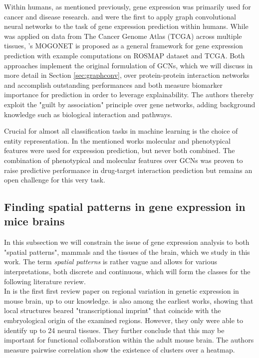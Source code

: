 \documentclass[]{article}
\renewcommand{\cite}{\citep}
\begin{document}
Within humans, as mentioned previously, gene expression was primarily used for cancer and disease research. \citet{schulte2021integration} and \citet{wang2021mogonet} were the first to apply graph convolutional neural networks to the task of gene expression prediction within humans. While \citet{schulte2021integration} was applied on data from The Cancer Genome Atlas (TCGA)\cite{tomczak2015review} across multiple tissues, \citet{wang2021mogonet}'s MOGONET is proposed as a general framework for gene expression prediction with example computations on ROSMAP dataset and TCGA. Both approaches implement the original formulation of GCNs\cite{GCNConv}, which we will discuss in more detail in Section \ref{sec:graphconv}, over protein-protein interaction networks and accomplish outstanding performances and both measure biomarker importance for prediction in order to leverage explainability. The authors thereby exploit the "guilt by association" principle \cite{Oliver2000, Gillis2012} over gene networks, adding background knowledge such as biological interaction and pathways.

Crucial for almost all classification tasks in machine learning is the choice of entity representation. In the mentioned works molecular \cite{schulte2021integration, modencode2010identification, noble2006support} and phenotypical \cite{wang2021mogonet, chikina2009global} features were used for expression prediction, but never both combined. The combination of phenotypical and molecular features over GCNs was proven to raise predictive performance in drug-target interaction prediction \cite{hinnerichs2021dti} but remains an open challenge for this very task.


\subsection{Finding spatial patterns in gene expression in mice brains}
\label{sec:relatedwork_micebrains}
In this subsection we will constrain the issue of gene expression analysis to both "spatial patterns", mammals and the tissues of the brain, which we study in this work. The term \textit{spatial patterns} is rather vague and allows for various interpretations, both discrete and continuous, which will form the classes for the following literature review.\\

In \citet{pavlidis_analysis_2001} is the first first review paper on regional variation in genetic expression in mouse brain, up to our knowledge.  
\citet{zapala2005adult} is also among the earliest works, showing that local structures beared "transcriptional imprint" that coincide with the embryological origin of the examined regions. However, they only were able to identify up to 24 neural tissues. They further conclude that this may be important for functional collaboration within the adult mouse brain. The authors measure pairwise correlation show the existence of clusters over a heatmap. \\
\end{document}
